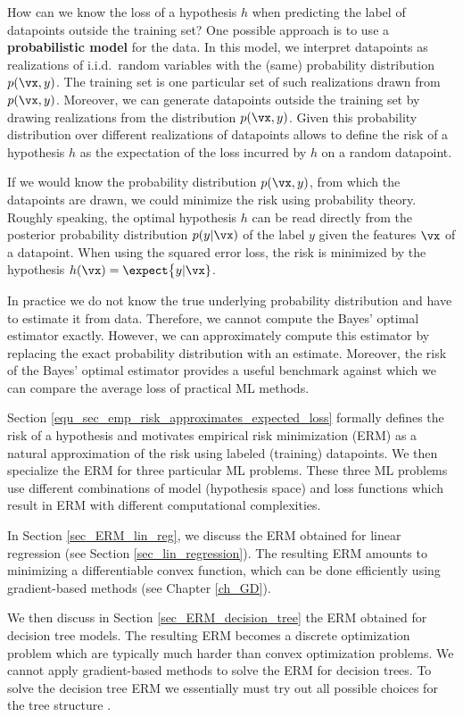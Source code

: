 \documentclass[12pt]{report}
\begin{document}
How can we know the loss of a hypothesis $h$ when predicting the label 
of datapoints outside the training set? One possible approach is to use 
a {\bf probabilistic model} for the data. In this model, we interpret datapoints 
as realizations of i.i.d. random variables with the (same) probability distribution 
$p(\vx,y)$. The training set is one particular set of such realizations drawn 
from $p(\vx,y)$. Moreover, we can generate datapoints outside the training 
set by drawing realizations from the distribution $p(\vx,y)$. Given this probability 
distribution over different realizations of datapoints allows to define the risk 
of a hypothesis $h$ as the expectation of the loss incurred by $h$ on a 
random datapoint. 

If we would know the probability distribution $p(\vx,y)$, from which the datapoints 
are drawn, we could minimize the risk using probability theory. 
Roughly speaking, the optimal hypothesis $h$ can be read directly from the 
posterior probability distribution $p(y|\vx)$ of the label $y$ 
given the features $\vx$ of a datapoint. When using the squared error loss, 
the risk is minimized by the hypothesis $h(\vx) = \expect \big\{ y | \vx \}$. 

In practice we do not know the true underlying probability 
distribution and have to estimate it from data. Therefore, 
we cannot compute the Bayes' optimal estimator exactly. 
However, we can approximately compute this estimator 
by replacing the exact probability distribution with an 
estimate. Moreover, the risk of the Bayes' optimal estimator 
provides a useful benchmark against which we can compare 
the average loss of practical ML methods. 

Section \eqref{equ_sec_emp_risk_approximates_expected_loss} formally 
defines the risk of a hypothesis and motivates empirical risk minimization (ERM) 
as a natural approximation of the risk using labeled (training) datapoints. 
We then specialize the ERM for three particular ML problems. These three 
ML problems use different combinations of model (hypothesis space) and 
loss functions which result in ERM with different computational complexities. 

In Section \ref{sec_ERM_lin_reg}, we discuss the ERM obtained for linear 
regression (see Section \ref{sec_lin_regression}). The resulting ERM amounts 
to minimizing a differentiable convex function, which can be done efficiently 
using gradient-based methods (see Chapter \ref{ch_GD}). 

We then discuss in Section \ref{sec_ERM_decision_tree} the ERM 
obtained for decision tree models. The resulting ERM becomes a 
discrete optimization problem which are typically much harder than 
convex optimization problems. We cannot apply gradient-based methods 
to solve the ERM for decision trees. To solve the decision tree ERM we 
essentially must try out all possible choices for the tree structure \cite{}. 
\end{document}
